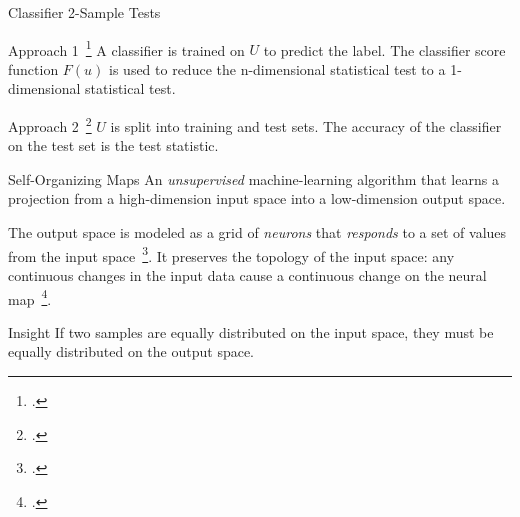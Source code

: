 \documentclass[10pt,compress]{beamer}
\begin{document}
\begin{frame}{Classifier 2-Sample Tests}
    \begin{block}{Approach 1~\footcite{friedman2004multivariate}}
        A classifier is trained on $U$ to predict the label. The classifier score function $F(u)$ is used
        to reduce the n-dimensional statistical test to a 1-dimensional statistical test.
    \end{block}
    \begin{block}{Approach 2~\footcite{lopez2016revisiting}}
        $U$ is split into training and test sets. The accuracy of the classifier on the test set is the test statistic.
    \end{block}

\end{frame}

\begin{frame}{Self-Organizing Maps}
    An \emph{unsupervised} machine-learning algorithm that learns
    a projection from a high-dimension input space into a low-dimension output space.

    \smallskip
    
    The output space is modeled as a grid of \emph{neurons} that \emph{responds} to a set of
    values from the input space~\footcite{kohonen1982self}.    
    \alert{It preserves the topology of the input space}: any continuous changes
    in the input data cause a continuous change on the neural map~\footcite{Villmann1999}.
    
    \begin{alertblock}{Insight}
        \smallskip
        If two samples are equally distributed on the input space, they must be equally distributed on the output space.
    \end{alertblock}    

\end{frame}
\end{document}
